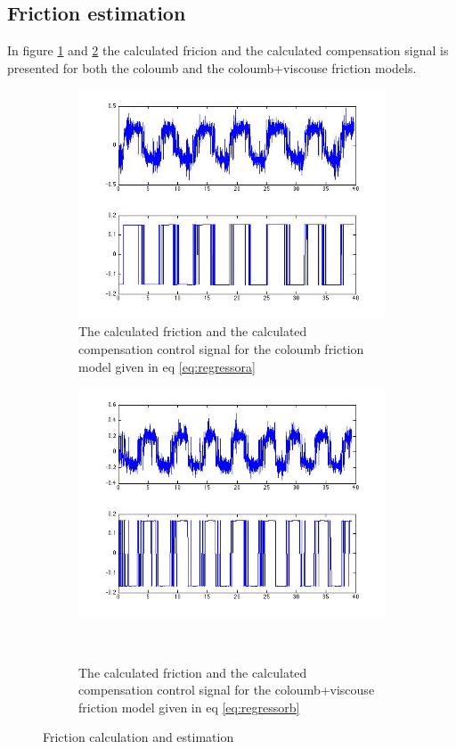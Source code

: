 \documentclass[10pt,a4paper]{article}
\begin{document}
\subsection{Friction estimation}
In figure \ref{subfigure:VLUFcol} and \ref{subfigure:VLUFvisc} the calculated fricion and the calculated compensation signal is presented for both the coloumb and the coloumb+viscouse friction models.
\begin{figure}[H]
\centering
	\begin{subfigure}[t]{0.49\textwidth}
	\includegraphics[scale=0.33]{plots/VLUFcol.jpg}
	\caption{The calculated friction and the calculated compensation control signal for the coloumb friction model given in eq \ref{eq:regressora}}
	\label{subfigure:VLUFcol}
	\end{subfigure}
	\begin{subfigure}[t]{0.49\textwidth}
	\includegraphics[scale=0.33]{plots/VLUFvisc.jpg}
	\caption{The calculated friction and the calculated compensation control signal for the coloumb+viscouse friction model given in eq \ref{eq:regressorb}}\
	\label{subfigure:VLUFvisc}
	\end{subfigure}
\caption{Friction calculation and estimation}
\label{fig:VLUF}
\end{figure}
\end{document}
